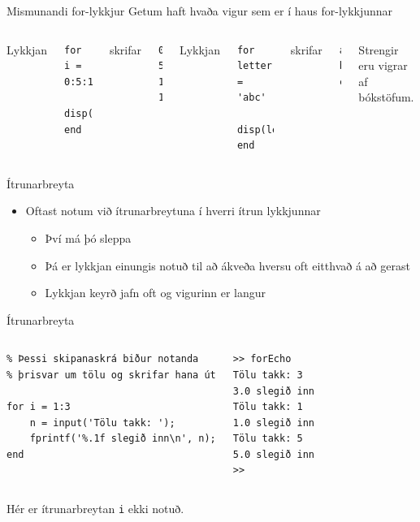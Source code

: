 \documentclass[handout]{beamer}
\begin{document}
\begin{frame}[fragile]{Mismunandi for-lykkjur}
Getum haft hvaða vigur sem er í haus for-lykkjunnar
\begin{columns}
Lykkjan
\begin{verbatim}
for i = 0:5:15
    disp(i)
end
\end{verbatim}
skrifar
\begin{verbatim}
0
5
10
15
\end{verbatim}


Lykkjan 
\begin{verbatim}
for letter = 'abc'
    disp(letter)
end
\end{verbatim}
skrifar
\begin{verbatim}
a
b
c
\end{verbatim}
Strengir eru vigrar af bókstöfum.
\end{columns}
\end{frame}

\begin{frame}[fragile]{Ítrunarbreyta}
\begin{itemize}
 \item Oftast notum við ítrunarbreytuna í hverri ítrun lykkjunnar
 \begin{itemize}
  \item Því má þó sleppa
  \item Þá er lykkjan einungis notuð til að ákveða hversu oft eitthvað á að gerast
  \item Lykkjan keyrð jafn oft og vigurinn er langur
 \end{itemize}
\end{itemize}
\end{frame}

\begin{frame}[fragile]{Ítrunarbreyta}
\begin{columns}
\begin{verbatim}
% Þessi skipanaskrá biður notanda 
% þrisvar um tölu og skrifar hana út

for i = 1:3
    n = input('Tölu takk: ');
    fprintf('%.1f slegið inn\n', n);
end
\end{verbatim}
\begin{verbatim}
>> forEcho
Tölu takk: 3
3.0 slegið inn
Tölu takk: 1
1.0 slegið inn
Tölu takk: 5
5.0 slegið inn
>>
\end{verbatim}
\end{columns}
\vspace{\baselineskip}
Hér er ítrunarbreytan \texttt{i} ekki notuð.
\end{frame}
\end{document}
